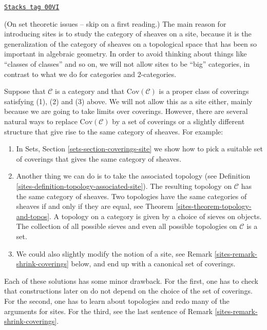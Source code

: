 \begin{remark}
\label{sites-remark-no-big-sites}
\href{https://stacks.math.columbia.edu/tag/00VI}{\texttt{Stacks tag 00VI}}

(On set theoretic issues -- skip on a first reading.)
The main reason for introducing sites is to study the
category of sheaves on a site, because it is the generalization
of the category of sheaves on a topological space that has
been so important in algebraic geometry. In order to avoid thinking
about things like ``classes of classes'' and so on, we will
not allow sites to be ``big'' categories, in contrast to what
we do for categories and $2$-categories.

\medskip\noindent
Suppose that $\mathcal{C}$ is a category and that
$\text{Cov}(\mathcal{C})$ is a proper class of coverings
satisfying (1), (2) and (3) above. We will not allow this as a
site either, mainly because we are going to take limits over coverings.
However, there are several natural
ways to replace $\text{Cov}(\mathcal{C})$ by a set of coverings
or a slightly different structure
that give rise to the same category of sheaves. For example:
\begin{enumerate}
\item In Sets, Section \ref{sets-section-coverings-site}
we show how to pick a suitable set of
coverings that gives the same category of sheaves.
\item Another thing we can do is to take the associated topology
(see Definition \ref{sites-definition-topology-associated-site}).
The resulting topology on $\mathcal{C}$ has the same category of sheaves.
Two topologies have the same categories of sheaves if and only if
they are equal, see Theorem \ref{sites-theorem-topology-and-topos}.
A topology on a category is given by a choice of sieves on objects.
The collection of all possible sieves and even all possible
topologies on $\mathcal{C}$ is a set.
\item We could also slightly modify the notion of a site, see
Remark \ref{sites-remark-shrink-coverings} below, and end up with a
canonical set of coverings.
\end{enumerate}
Each of these solutions has some minor drawback. For the first, one has
to check that constructions later on do not depend on the choice
of the set of coverings. For the second, one has to learn about topologies
and redo many of the arguments for sites. For the third, see
the last sentence of Remark \ref{sites-remark-shrink-coverings}.


\end{remark}
